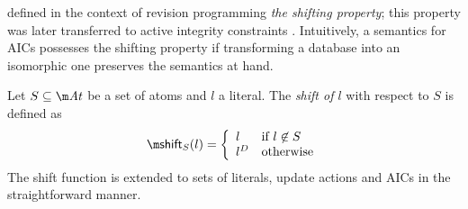 



\citet{tcs/MarekT98} defined in the context of revision programming \emph{the shifting property}; this property was later transferred to active integrity constraints \cite{tplp/CaropreseT11}. 
Intuitively, a semantics for AICs possesses the shifting property if transforming a database into an isomorphic one preserves the semantics at hand. 

\begin{definition}
 Let $S\subseteq\atoms$ be a set of atoms and $l$ a literal. The \emph{shift of $l$} with respect to $S$ is defined as 
 \[\shift_S(l) = \left\{\begin{array}{ll}                                                                                                             l&\text{if $l\not\in S$}\\                                                                                                              l^D&\text{otherwise}                                                                                                                                      \end{array}\right.\]
 The shift function is extended to sets of literals, update actions and AICs in the straightforward manner. 
\end{definition}

